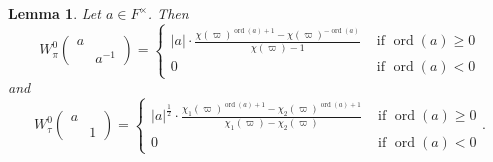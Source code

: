\documentclass[11pt]{amsart}
\newtheorem{lemma}[theorem]{Lemma}
\theoremstyle{definition}
\theoremstyle{remark}
\newcommand{\on}{\operatorname}
\newcommand{\ord}{\on{ord}}
\begin{document}
\begin{lemma}\cite[Theorem 5.4]{CasselmanShalika1980II}
Let $a\in F^\times$. Then 
\begin{equation*}
W_\pi^0  \left( \begin{smallmatrix} a & \\ & a^{-1}\end{smallmatrix}\right) =  
 \begin{cases}
|a| \cdot \frac{\chi(\varpi)^{\ord(a)+1}-\chi(\varpi)^{-\ord(a)}}{\chi(\varpi)-1}   &\text{ if } \ord(a)\ge 0 \\
0 & \text{ if }\ord(a)< 0
\end{cases}
\end{equation*}
and 
\begin{equation*}
W_\tau^0\left( \begin{smallmatrix} a & \\&1\end{smallmatrix}\right)=
 \begin{cases}
 |a|^{\frac{1}{2}} \cdot   \frac{\chi_1(\varpi)^{\ord(a)+1}-\chi_2(\varpi)^{\ord(a)+1} }{\chi_1(\varpi)-\chi_2(\varpi)} &\text{ if }\ord(a)\ge 0\\
 0 &\text{ if }\ord(a)<0
 \end{cases}.
 \end{equation*}  
 \label{lemma-CasselmanShalika}
\end{lemma}
\end{document}
